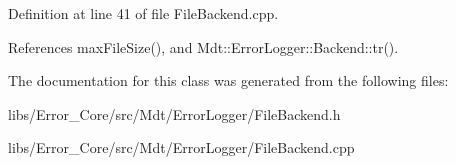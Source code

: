 Definition at line 41 of file File\+Backend.\+cpp.



References max\+File\+Size(), and Mdt\+::\+Error\+Logger\+::\+Backend\+::tr().



The documentation for this class was generated from the following files\+:\begin{DoxyCompactItemize}
\item 
libs/\+Error\+\_\+\+Core/src/\+Mdt/\+Error\+Logger/File\+Backend.\+h\item 
libs/\+Error\+\_\+\+Core/src/\+Mdt/\+Error\+Logger/File\+Backend.\+cpp\end{DoxyCompactItemize}
